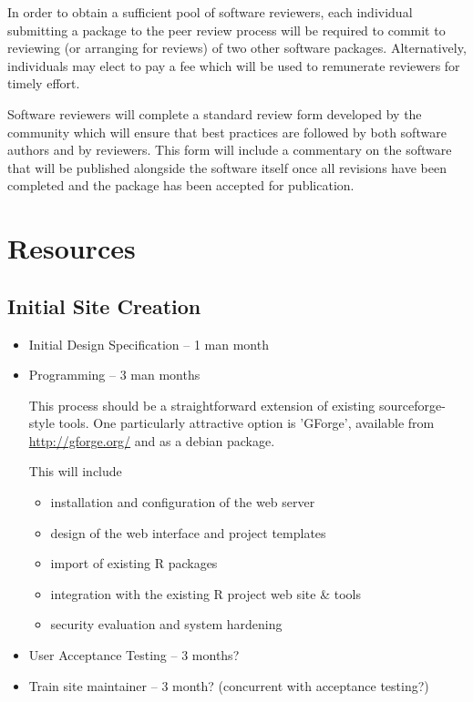 \documentclass[12pt]{article}
\begin{document}
In order to obtain a sufficient pool of software reviewers, each
individual submitting a package to the peer review process will be
required to commit to reviewing (or arranging for reviews) of two
other software packages.  Alternatively, individuals may elect to pay
a fee which will be used to remunerate reviewers for timely effort.

Software reviewers will complete a standard review form developed by
the community which will ensure that best practices are followed by
both software authors and by reviewers.  This form will include a
commentary on the software that will be published alongside the
software itself once all revisions have been completed and the package
has been accepted for publication.

\section{Resources}

\subsection{Initial Site Creation}

\begin{itemize}
\item Initial Design Specification -- 1 man month

\item Programming -- 3 man months

  This process should be a straightforward extension of existing
  sourceforge-style tools.  One particularly attractive option is
  'GForge', available from \url{http://gforge.org/} and as a debian package.

  This will include
  \begin{itemize}
  \item installation and configuration of the web server
  \item design of the web interface and project templates
  \item import of existing R packages
  \item integration with the existing R project web site \& tools
  \item security evaluation and system hardening
  \end{itemize}

\item User Acceptance Testing -- 3 months?

\item Train site maintainer -- 3 month?  (concurrent with acceptance testing?)

\end{itemize}
\end{document}
